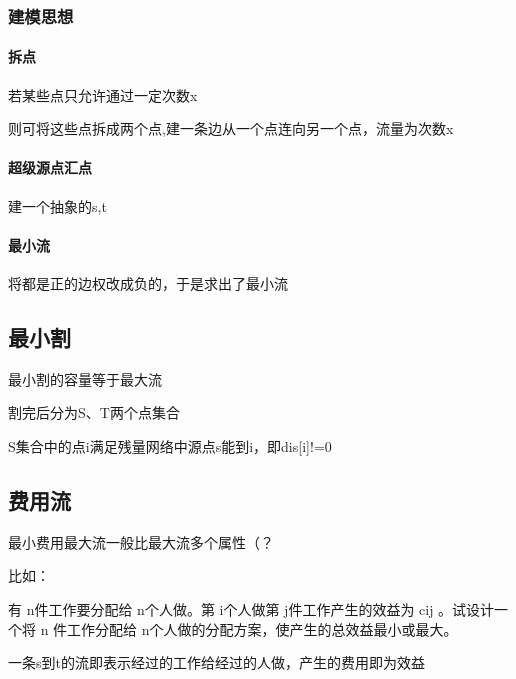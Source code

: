 \documentclass[]{article}
\let\oldparagraph\paragraph
\renewcommand{\paragraph}[1]{\oldparagraph{#1}\mbox{}}
\begin{document}
\hypertarget{ux5efaux6a21ux601dux60f3}{%
\subsubsection{建模思想}\label{ux5efaux6a21ux601dux60f3}}

\hypertarget{ux62c6ux70b9}{%
\paragraph{拆点}\label{ux62c6ux70b9}}

若某些点只允许通过一定次数x

则可将这些点拆成两个点,建一条边从一个点连向另一个点，流量为次数x

\hypertarget{ux8d85ux7ea7ux6e90ux70b9ux6c47ux70b9}{%
\paragraph{超级源点汇点}\label{ux8d85ux7ea7ux6e90ux70b9ux6c47ux70b9}}

建一个抽象的s,t

\hypertarget{ux6700ux5c0fux6d41}{%
\paragraph{最小流}\label{ux6700ux5c0fux6d41}}

将都是正的边权改成负的，于是求出了最小流

\hypertarget{ux6700ux5c0fux5272}{%
\subsection{最小割}\label{ux6700ux5c0fux5272}}

最小割的容量等于最大流

割完后分为S、T两个点集合

S集合中的点i满足残量网络中源点s能到i，即dis{[}i{]}!=0

\hypertarget{ux8d39ux7528ux6d41}{%
\subsection{费用流}\label{ux8d39ux7528ux6d41}}

最小费用最大流一般比最大流多个属性（？

比如：

有 n件工作要分配给 n个人做。第 i个人做第 j件工作产生的效益为 cij
。试设计一个将 n 件工作分配给
n个人做的分配方案，使产生的总效益最小或最大。

一条s到t的流即表示经过的工作给经过的人做，产生的费用即为效益
\end{document}
